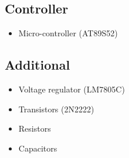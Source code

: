 \documentclass[11pt]{article}
\begin{document}
\subsection*{Controller}
\begin{itemize}
    \item Micro-controller (AT89S52)
\end{itemize}

\subsection*{Additional}
\begin{itemize}
    \item Voltage regulator (LM7805C)
\item Transistors (2N2222) 
\item Resistors
\item Capacitors

\end{itemize}
	
\end{document}
